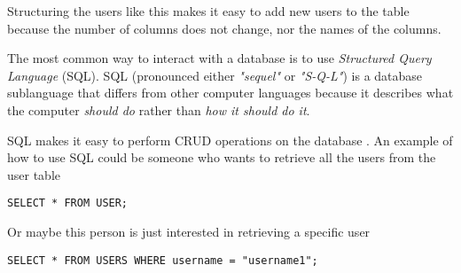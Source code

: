 Structuring the users like this makes it easy to add new users to the table because the number of columns does not change, nor the names of the columns.

The most common way to interact with a database is to use \textit{Structured Query Language} (SQL).
SQL (pronounced either \textit{"sequel"} or \textit{"S-Q-L"}) is a database sublanguage that differs from other computer languages because it describes what the computer \textit{should do} rather than \textit{how it should do it}. \cite{SQLIntroduction}

SQL makes it easy to perform CRUD operations on the database \cite{OracleWhatIsDatabase}.
An example of how to use SQL could be someone who wants to retrieve all the users from the user table

\begin{lstlisting}
SELECT * FROM USER;
\end{lstlisting}

Or maybe this person is just interested in retrieving a specific user

\begin{lstlisting}
SELECT * FROM USERS WHERE username = "username1";
\end{lstlisting}



